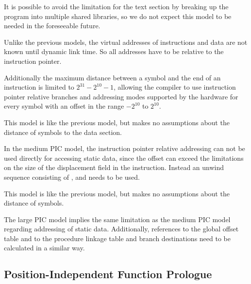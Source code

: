 \begin{description}
  It is possible to avoid the limitation for the text section by
  breaking up the program into multiple shared libraries, so we do not
  expect this model to be needed in the foreseeable future.

\item[\textindex{Small position independent code model} (\textindex{PIC})]

  Unlike the previous models, the virtual addresses of instructions
  and data are not known until dynamic link time.  So all addresses
  have to be relative to the instruction pointer.

  Additionally the maximum distance between a symbol and the end of an
  instruction is limited to $2^{31}-2^{10}-1$, allowing the compiler
  to use instruction pointer relative branches and addressing modes
  supported by the hardware for every symbol with an offset in the
  range $-2^{10}$ to $2^{10}$.

\item[\textindex{Medium position independent code model}
  (\textindex{PIC})]

  This model is like the previous model, but makes no assumptions
  about the distance of symbols to the data section.

  In the medium PIC model, the instruction pointer relative addressing
  can not be used directly for accessing static data, since the offset
  can exceed the limitations on the size of the displacement field in
  the instruction.  Instead an unwind sequence consisting of
  ,  and  needs to be used.

\item[\textindex{Large position independent code model}
  (\textindex{PIC})]

  This model is like the previous model, but makes no assumptions
  about the distance of symbols.

  The large PIC model implies the same limitation as the medium
  PIC model regarding addressing of static data.  Additionally,
  references to the global offset table and to the procedure linkage
  table and branch destinations need to be calculated in a similar
  way.

\end{description}

\subsection{Position-Independent Function Prologue}

